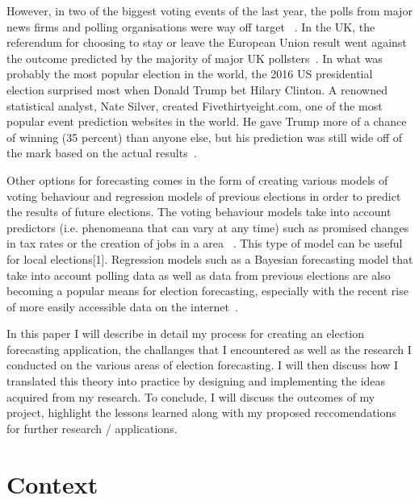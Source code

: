 However, in two of the biggest voting events of the last year, the polls from major news firms and polling organisations were way off target ~\cite{ukbusinsider}.
In the UK, the referendum for choosing to stay or leave the European Union result went against the outcome predicted by the majority of major UK pollsters~\cite{bbcnews}.
In what was probably the most popular election in the world, the 2016 US presidential election surprised most when Donald Trump bet Hilary Clinton. A renowned statistical analyst, Nate Silver, created Fivethirtyeight.com, one of the most popular event prediction websites in the world. He gave Trump more of a chance of winning (35 percent) than anyone else, but his prediction was still wide off of the mark based on the actual results~\cite{natesilver}.

Other options for forecasting comes in the form of creating various models of voting behaviour and regression models of previous elections in order to predict the results of future elections. The voting behaviour models take into account predictors (i.e. phenomeana that can vary at any time) such as promised changes in tax rates or the creation of jobs in a area ~\cite{stegmaier}. This type of model can be useful for local elections[1]. Regression models such as a Bayesian forecasting model that take into account polling data as well as data from previous elections are also becoming a popular means for election forecasting, especially with the recent rise of more easily accessible data on the internet~\cite{rigdon}.

In this paper I will describe in detail my process for creating an election forecasting application, the challanges that I encountered as well as the research I conducted on the various areas of election forecasting.  I will then discuss how I translated this theory into practice by designing and implementing the ideas acquired from my research. To conclude, I will discuss the outcomes of my project, highlight the lessons learned along with my proposed reccomendations for further research / applications.

\chapter{Context}

